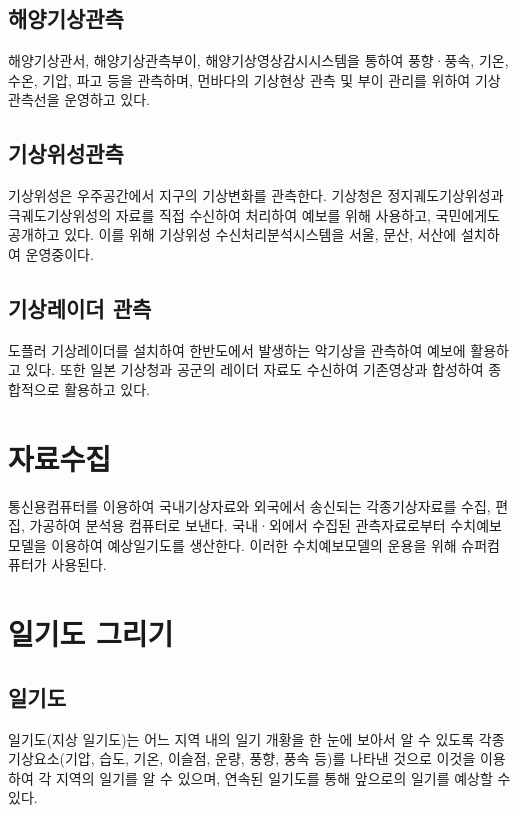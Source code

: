 \subsection{해양기상관측}
해양기상관서, 해양기상관측부이, 해양기상영상감시시스템을 통하여 풍향·풍속, 기온, 수온, 기압, 파고 등을 관측하며, 먼바다의 기상현상 관측 및 부이 관리를 위하여 기상관측선을 운영하고 있다.

\subsection{기상위성관측}
기상위성은 우주공간에서 지구의 기상변화를 관측한다. 기상청은 정지궤도기상위성과 극궤도기상위성의 자료를 직접 수신하여 처리하여 예보를 위해 사용하고, 국민에게도 공개하고 있다. 이를 위해 기상위성 수신처리분석시스템을 서울, 문산, 서산에 설치하여 운영중이다.

\subsection{기상레이더 관측}
도플러 기상레이더를 설치하여 한반도에서 발생하는 악기상을 관측하여 예보에 활용하고 있다. 또한 일본 기상청과 공군의 레이더 자료도 수신하여 기존영상과 합성하여 종합적으로 활용하고 있다.


\section{자료수집}
통신용컴퓨터를 이용하여 국내기상자료와 외국에서 송신되는 각종기상자료를 수집, 편집, 가공하여 분석용 컴퓨터로 보낸다. 국내·외에서 수집된 관측자료로부터 수치예보모델을 이용하여 예상일기도를 생산한다. 이러한 수치예보모델의 운용을 위해 슈퍼컴퓨터가 사용된다.



\section{일기도 그리기}

\subsection{일기도}
일기도(지상 일기도)는 어느 지역 내의 일기 개황을 한 눈에 보아서 알 수 있도록
각종 기상요소(기압, 습도, 기온, 이슬점, 운량, 풍향, 풍속 등)를 나타낸 것으로 이것을
이용하여 각 지역의 일기를 알 수 있으며, 연속된 일기도를 통해 앞으로의 일기를 예상할 수 있다.

